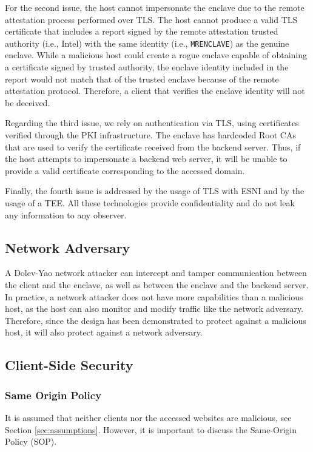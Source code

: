 For the second issue, the host cannot impersonate the enclave due to the remote attestation process performed over TLS. The host cannot produce a valid TLS certificate that includes a report signed by the remote attestation trusted authority (i.e., Intel) with the same identity (i.e., \texttt{MRENCLAVE}) as the genuine enclave. While a malicious host could create a rogue enclave capable of obtaining a certificate signed by trusted authority, the enclave identity included in the report would not match that of the trusted enclave because of the remote attestation protocol. Therefore, a client that verifies the enclave identity will not be deceived.

Regarding the third issue, we rely on authentication via TLS, using certificates verified through the PKI infrastructure. The enclave has hardcoded Root CAs that are used to verify the certificate received from the backend server. Thus, if the host attempts to impersonate a backend web server, it will be unable to provide a valid certificate corresponding to the accessed domain.

Finally, the fourth issue is addressed by the usage of TLS with ESNI and by the usage of a TEE. All these technologies provide confidentiality and do not leak any information to any observer. 

\subsection{Network Adversary}
A Dolev-Yao network attacker can intercept and tamper communication between the client and the enclave, as well as between the enclave and the backend server. In practice, a network attacker does not have more capabilities than a malicious host, as the host can also monitor and modify traffic like the network adversary. Therefore, since the design has been demonstrated to protect against a malicious host, it will also protect against a network adversary.

\subsection{Client-Side Security}

\subsubsection{Same Origin Policy}
It is assumed that neither clients nor the accessed websites are malicious, see Section \ref{sec:assumptions}. However, it is important to discuss the Same-Origin Policy (SOP).


